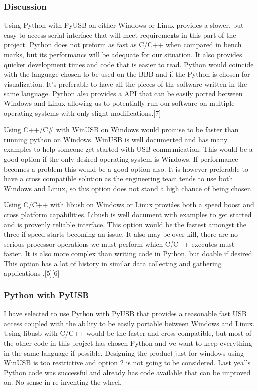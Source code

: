 \documentclass[10pt,draftclsnofoot,onecolumn,retainorgcmds]{IEEEtran}
\begin{document}
\subsubsection{Discussion}
Using Python with PyUSB on either Windows or Linux provides a slower, but easy to access serial interface that will meet requirements in this part of the project. Python does not preform as fast as C/C++ when compared in bench marks, but its performance will be adequate for our situation. It also provides quicker development times and code that is easier to read. Python would coincide with the language chosen to be used on the BBB and if the Python is chosen for visualization. It’s preferable to have all the pieces of the software written in the same language. Python also provides a API that can be easily ported between Windows and Linux allowing us to potentially run our software on multiple operating systems with only slight modifications.[7] \par
Using C++/C\# with WinUSB on Windows would promise to be faster than running python on Windows. WinUSB is well documented and has many examples to help someone get started with USB communication. This would be a good option if the only desired operating system is Windows.  If performance becomes a problem this would be a good option also. It is however preferable to have a cross compatible solution as the engineering team tends to use both Windows and Linux, so this option does not stand a high chance of being chosen. \par
Using C/C++ with libusb on Windows or Linux provides both a speed boost and cross platform capabilities.  Libusb is well document with examples to get started and is provenly reliable interface. This option would be the fastest amongst the three if speed starts becoming an issue. It also may be over kill, there are no serious processor operations we must perform which C/C++ executes must faster. It is also more complex than writing code in Python, but doable if desired. This option has a lot of history in similar data collecting and gathering applications .[5][6] \\

\subsubsection{Python with PyUSB}
I have selected to use Python with PyUSB that provides a reasonable fast USB access coupled with the ability to be easily portable between Windows and Linux. Using libusb with C/C++ would be the faster and cross compatible, but most of the other code in this project has chosen Python and we want to keep everything in the same language if possible. Designing the product just for windows using WinUSB is too restrictive and option 2 is not going to be considered. Last yea'’s Python code was successful and already has code available that can be improved on. No sense in re-inventing the wheel.
\end{document}

